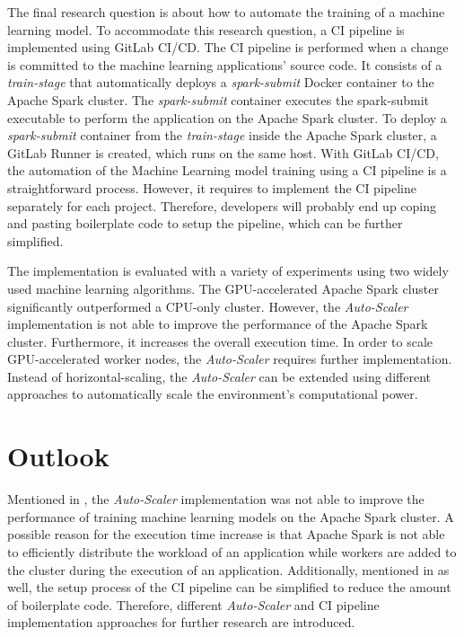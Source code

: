 The final research question is about how to automate the training of a machine learning model.
%
To accommodate this research question, a CI pipeline is implemented using GitLab CI/CD. The CI pipeline is performed when a change is committed to the machine learning applications' source code.
It consists of a \textit{train-stage} that automatically deploys a \textit{spark-submit} Docker container to the Apache Spark cluster.
The \textit{spark-submit} container executes the spark-submit executable to perform the application on the Apache Spark cluster.
To deploy a \textit{spark-submit} container from the \textit{train-stage} inside the Apache Spark cluster, a GitLab Runner is created, which runs on the same host.
With GitLab CI/CD, the automation of the Machine Learning model training using a CI pipeline is a straightforward process. However, it requires to implement the CI pipeline separately for each project. Therefore, developers will probably end up coping and pasting boilerplate code to setup the pipeline, which can be further simplified.


The implementation is evaluated with a variety of experiments using two widely used machine learning algorithms.
The GPU-accelerated Apache Spark cluster significantly outperformed a CPU-only cluster.
However, the \textit{Auto-Scaler} implementation is not able to improve the performance of the Apache Spark cluster. Furthermore, it increases the overall execution time. In order to scale GPU-accelerated worker nodes, the \textit{Auto-Scaler} requires further implementation. Instead of horizontal-scaling, the \textit{Auto-Scaler} can be extended using different approaches to automatically scale the environment's computational power.


\section{Outlook}
Mentioned in , the \textit{Auto-Scaler} implementation was not able to improve the performance of training machine learning models on the Apache Spark cluster.
A possible reason for the execution time increase is that Apache Spark is not able to efficiently distribute the workload of an application while workers are added to the cluster during the execution of an application.
Additionally, mentioned in  as well, the setup process of the CI pipeline can be simplified to reduce the amount of boilerplate code.
Therefore, different \textit{Auto-Scaler} and CI pipeline implementation approaches for further research are introduced.



